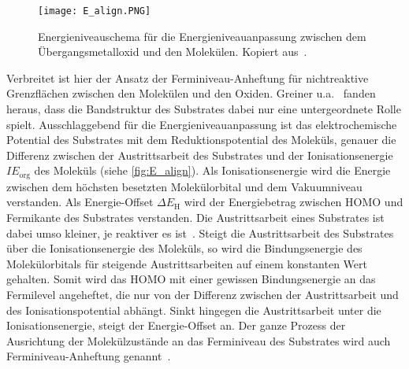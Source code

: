             \begin{figure}
                \centering
                \texttt{[image: E\_align.PNG]}
                \caption{Energieniveauschema für die Energieniveauanpassung zwischen dem Übergangsmetalloxid und den Molekülen. Kopiert aus~\cite{IF_3}.}
                \label{fig:E_align}
            \end{figure}
            Verbreitet ist hier der Ansatz der Ferminiveau-Anheftung für nichtreaktive Grenzflächen zwischen den Molekülen und den Oxiden.
            Greiner u.a.~\cite{IF_3} fanden heraus, dass die Bandstruktur des Substrates dabei nur eine untergeordnete Rolle spielt.
            Ausschlaggebend für die Energieniveauanpassung ist das elektrochemische Potential des Substrates mit dem Reduktionspotential des Moleküls, genauer die Differenz zwischen der Austrittsarbeit des Substrates und der Ionisationsenergie $IE_\text{org}$ des Moleküls (siehe \autoref{fig:E_align}).
            Als Ionisationsenergie wird die Energie zwischen dem höchsten besetzten Molekülorbital und dem Vakuumniveau verstanden.
            Als Energie-Offset $\Delta E_\text{H}$ wird der Energiebetrag zwischen HOMO und Fermikante des Substrates verstanden.
            Die Austrittsarbeit eines Substrates ist dabei umso kleiner, je reaktiver es ist~\cite{5A_5}.
            Steigt die Austrittsarbeit des Substrates über die Ionisationsenergie des Moleküls, so wird die Bindungsenergie des Molekülorbitals für steigende Austrittsarbeiten auf einem konstanten Wert gehalten.
            Somit wird das HOMO mit einer gewissen Bindungsenergie an das Fermilevel angeheftet, die nur von der Differenz zwischen der Austrittsarbeit und des Ionisationspotential abhängt.
            Sinkt hingegen die Austrittsarbeit unter die Ionisationsenergie, steigt der Energie-Offset an.
            Der ganze Prozess der Ausrichtung der Molekülzustände an das Ferminiveau des Substrates wird auch Ferminiveau-Anheftung genannt~\cite{IF_3}.

